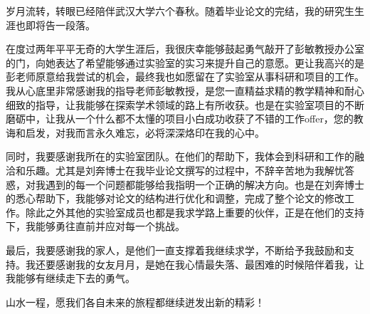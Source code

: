 
岁月流转，转眼已经陪伴武汉大学六个春秋。随着毕业论文的完结，我的研究生生涯也即将告一段落。

在度过两年平平无奇的大学生涯后，我很庆幸能够鼓起勇气敲开了彭敏教授办公室的门，向她表达了希望能够通过实验室的实习来提升自己的意愿。更让我高兴的是彭老师原意给我尝试的机会，最终我也如愿留在了实验室从事科研和项目的工作。我从心底里非常感谢我的指导老师彭敏教授，是您一直精益求精的教学精神和耐心细致的指导，让我能够在探索学术领域的路上有所收获。也是在实验室项目的不断磨砺中，让我从一个什么都不太懂的项目小白成功收获了不错的工作offer，您的教诲和启发，对我而言永久难忘，必将深深烙印在我的心中。

同时，我要感谢我所在的实验室团队。在他们的帮助下，我体会到科研和工作的融洽和乐趣。尤其是刘奔博士在我毕业论文撰写的过程中，不辞辛苦地为我解忧答惑，对我遇到的每一个问题都能够给我指明一个正确的解决方向。也是在刘奔博士的悉心帮助下，我能够对论文的结构进行优化和调整，完成了整个论文的修改工作。除此之外其他的实验室成员也都是我求学路上重要的伙伴，正是在他们的支持下，我能够勇往直前并应对每一个挑战。

最后，我要感谢我的家人，是他们一直支撑着我继续求学，不断给予我鼓励和支持。我还要感谢我的女友月月，是她在我心情最失落、最困难的时候陪伴着我，让我能够有继续走下去的勇气。

山水一程，愿我们各自未来的旅程都继续迸发出新的精彩！
